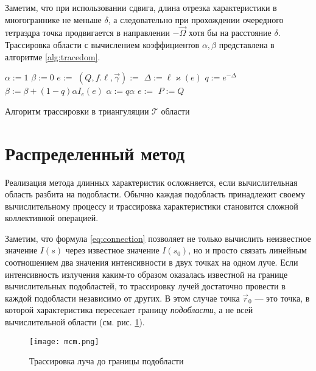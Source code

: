 Заметим, что при использовании сдвига, длина отрезка характеристики в многограннике не меньше $\delta$, а следовательно при прохождении очередного тетраэдра точка продвигается в направлении $-\vec \Omega$ хотя бы на расстояние $\delta$.
Трассировка области с вычислением коэффициентов $\alpha, \beta$ представлена в алгоритме \ref{alg:tracedom}.

\begin{algorithm}[ht!]
\centering
\begin{algorithmic}[1]
\State $\alpha := 1$
\State $\beta := 0$
\State $e := $ 
\Repeat
\State $(Q, f. \ell, \vec\gamma) :=$ 
\State $\Delta := \ell \varkappa(e) $
\State $q := e^{-\Delta}$
\State $\beta := \beta + (1 - q)\alpha I_e(e)$
\State $\alpha := q\alpha$
\State $e := $ 
\State $P := Q$
\State{}
\EndFunction
\end{algorithmic}
\caption{Алгоритм трассировки в триангуляции $\mathcal{T}$ области}
\label{alg:tracedom}
\end{algorithm}

\section{Распределенный метод}

Реализация метода длинных характеристик осложняется, если вычислительная область разбита на подобласти. Обычно каждая подобласть принадлежит своему вычислительному процессу и трассировка характеристики становится сложной коллективной операцией.

Заметим, что формула \eqref{eq:connection} позволяет не только вычислить неизвестное значение $I(s)$ через известное значение $I(s_0)$, но и просто связать
линейным соотношением два значения интенсивности в двух точках на одном луче.
Если интенсивность излучения каким-то образом оказалась известной на границе вычислительных подобластей, то трассировку лучей достаточно провести в каждой подобласти независимо от других. В этом случае точка $\vec r_0$ --- это точка, в которой характеристика пересекает границу \emph{подобласти}, а не всей вычислительной области (см. рис. \ref{fig:mcm}).

\begin{figure}[ht]
\centering
\texttt{[image: mcm.png]}
\caption{Трассировка луча до границы подобласти}
\label{fig:mcm}
\end{figure}

